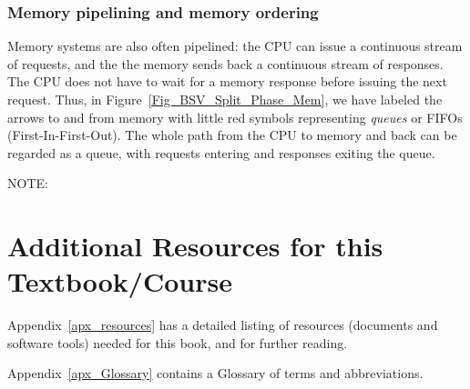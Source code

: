 
\subsubsection{Memory pipelining and memory ordering}

Memory systems are also often pipelined: the CPU can issue a
continuous stream of requests, and the the memory sends back a
continuous stream of responses.  The CPU does not have to wait for a
memory response before issuing the next request.  Thus, in
Figure~\ref{Fig_BSV_Split_Phase_Mem}, we have labeled the arrows to
and from memory with little red symbols representing \emph{queues} or
FIFOs (First-In-First-Out).  The whole path from the CPU to memory and
back can be regarded as a queue, with requests entering and responses
exiting the queue.


\vspace{1ex}

NOTE: 

\vspace{1ex}



\section{Additional Resources for this Textbook/Course}

Appendix~\ref{apx_resources} has a detailed listing of resources
(documents and software tools) needed for this book, and for further
reading.

Appendix~\ref{apx_Glossary} contains a Glossary of terms and
abbreviations.

